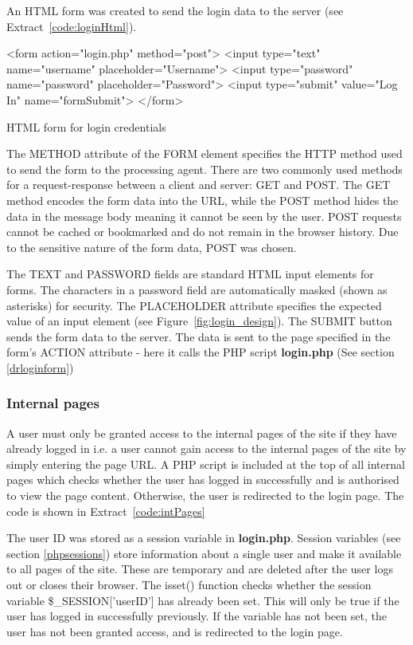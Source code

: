 \documentclass[11pt]{article}
\begin{document}
An HTML form was created to send the login data to the server (see Extract~\ref{code:loginHtml}).

\begin{code}[ht]
\begin{html}
<form action="login.php" method="post">
	<input type="text" name="username" placeholder="Username">
	<input type="password" name="password" placeholder="Password"> 
	<input type="submit" value="Log In" name="formSubmit">  
</form>
\end{html}
\caption{HTML form for login credentials}
\label{code:loginHtml}
\end{code}


The METHOD attribute of the FORM element specifies the HTTP method used to send the form to the processing agent. There are two commonly used methods for a request-response between a client and server: GET and POST. The GET method encodes the form data into the URL, while the POST method hides the data in the message body meaning it cannot be seen by the user. POST requests cannot be cached or bookmarked and do not remain in the browser history. Due to the sensitive nature of the form data, POST was chosen.

The TEXT and PASSWORD fields are standard HTML input elements for forms. The characters in a password field are automatically masked (shown as asterisks) for security. The PLACEHOLDER attribute specifies the expected value of an input element (see Figure~\ref{fig:login_design}). The SUBMIT button sends the form data to the server. The data is sent to the page specified in the form's ACTION attribute - here it calls the PHP script \textbf{login.php} (See section \ref{drloginform})


\subsubsection{Internal pages}

A user must only be granted access to the internal pages of the site if they have already logged in i.e. a user cannot gain access to the internal pages of the site by simply entering the page URL. A PHP script is included at the top of all internal pages which checks whether the user has logged in successfully and is authorised to view the page content. Otherwise, the user is redirected to the login page. The code is shown in Extract~\ref{code:intPages}

The user ID was stored as a session variable in \textbf{login.php}. Session variables (see section \ref{phpsessions}) store information about a single user and make it available to all pages of the site. These are temporary and are deleted after the user logs out or closes their browser. The isset() function checks whether the session variable \mbox{\$\_SESSION['userID']} has already been set. This will only be true if the user has logged in successfully previously. If the variable has not been set, the user has not been granted access, and is redirected to the login page.
\end{document}
